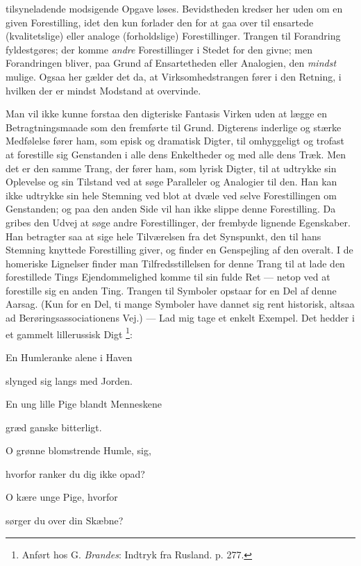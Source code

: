 \documentclass[12pt,a4paper,openany]{book}
\newcommand{\opage}[1]{\marginnote{\footnotesize\textit{[#1]}}}
\begin{document}
tilsyneladende modsigende Opgave løses. Bevidstheden kredser her uden om en
given Forestilling, idet den kun forlader den for at gaa over til ensartede
(kvalitetslige) eller analoge (forholdslige) Forestillinger. Trangen til
Forandring fyldestgøres; der komme \emph{andre} Forestillinger i Stedet for den
givne; men Forandringen bliver, paa Grund af Ensartetheden eller Analogien, den
\emph{mindst} mulige. Ogsaa her gælder det da, at Virksomhedstrangen fører i
den Retning, i hvilken der er mindst Modstand at overvinde.

\setcounter{footnote}{0}%
\opage{55}Man vil ikke kunne forstaa den digteriske Fantasis Virken uden at
lægge en Betragtningsmaade som den fremførte til Grund. Digterens inderlige og
stærke Medfølelse fører ham, som episk og dramatisk Digter, til omhyggeligt og
trofast at forestille sig Genstanden i alle dens Enkeltheder og med alle dens
Træk. Men det er den samme Trang, der fører ham, som lyrisk Digter, til at
udtrykke sin Oplevelse og sin Tilstand ved at søge Paralleler og Analogier til
den. Han kan ikke udtrykke sin hele Stemning ved blot at dvæle ved selve
Forestillingen om Genstanden; og paa den anden Side vil han ikke slippe denne
Forestilling. Da gribes den Udvej at søge andre Forestillinger, der frembyde
lignende Egenskaber. Han betragter saa at sige hele Tilværelsen fra det
Synspunkt, den til hans Stemning knyttede Forestilling giver, og finder en
Genspejling af den overalt. I de homeriske Lignelser finder man
Tilfredsstillelsen for denne Trang til at lade den forestillede Tings
Ejendommelighed komme til sin fulde Ret --- netop ved at forestille sig en
anden Ting. Trangen til Symboler opstaar for en Del af denne Aarsag. (Kun for
en Del, ti mange Symboler have dannet sig rent historisk, altsaa ad
Berøringsassociationens Vej.) --- Lad mig tage et enkelt Exempel. Det hedder i
et gammelt lillerussisk Digt%
\footnote[1]{Anført hos G. \emph{Brandes}: Indtryk fra Rusland. p. 277.}:

En Humleranke alene i Haven

slynged sig langs med Jorden.

En ung lille Pige blandt Menneskene

græd ganske bitterligt.

O grønne blomstrende Humle, sig,

hvorfor ranker du dig ikke opad?

O kære unge Pige, hvorfor

sørger du over din Skæbne?
\end{document}
